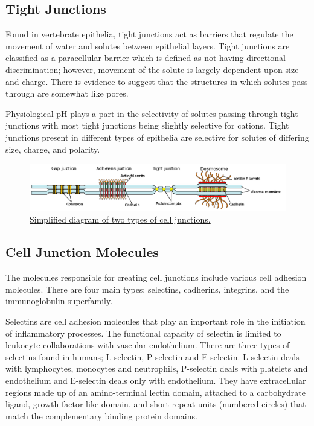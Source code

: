 \hypertarget{tight-junctions}{%
\subsection{Tight Junctions}\label{tight-junctions}}

Found in vertebrate epithelia, tight junctions act as barriers that regulate the movement of water and solutes between epithelial layers. Tight junctions are classified as a paracellular barrier which is defined as not having directional discrimination; however, movement of the solute is largely dependent upon size and charge. There is evidence to suggest that the structures in which solutes pass through are somewhat like pores.

Physiological pH plays a part in the selectivity of solutes passing through tight junctions with most tight junctions being slightly selective for cations. Tight junctions present in different types of epithelia are selective for solutes of differing size, charge, and polarity.



\begin{figure}

{\centering \includegraphics[width=0.7\linewidth]{./figures/membrane/Cell_junction_simplified_en} 

}

\caption{\href{https://commons.wikimedia.org/wiki/File:Cell_junction_simplified_en.svg}{Simplified diagram of two types of cell junctions.}}\label{fig:celljunction}
\end{figure}

\hypertarget{cell-junction-molecules}{%
\subsection{Cell Junction Molecules}\label{cell-junction-molecules}}

The molecules responsible for creating cell junctions include various cell adhesion molecules. There are four main types: selectins, cadherins, integrins, and the immunoglobulin superfamily.

Selectins are cell adhesion molecules that play an important role in the initiation of inflammatory processes. The functional capacity of selectin is limited to leukocyte collaborations with vascular endothelium. There are three types of selectins found in humans; L-selectin, P-selectin and E-selectin. L-selectin deals with lymphocytes, monocytes and neutrophils, P-selectin deals with platelets and endothelium and E-selectin deals only with endothelium. They have extracellular regions made up of an amino-terminal lectin domain, attached to a carbohydrate ligand, growth factor-like domain, and short repeat units (numbered circles) that match the complementary binding protein domains.

